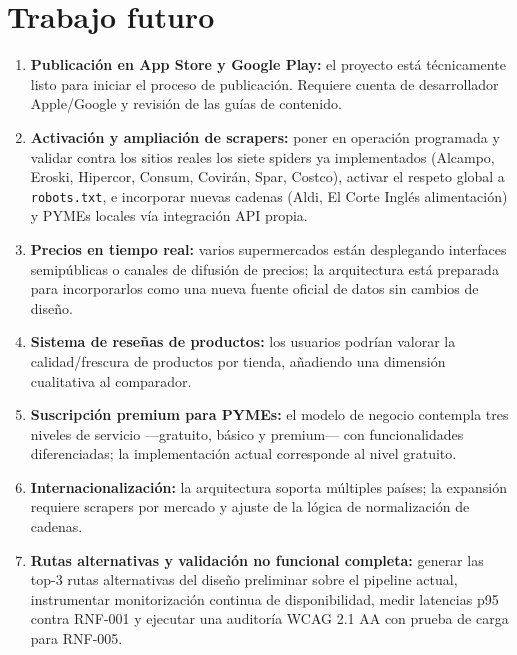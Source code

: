 \section{Trabajo futuro}\label{sec:trabajofuturo}

\begin{enumerate}
  \item \textbf{Publicaci\'on en App Store y Google Play:} el proyecto est\'a t\'ecnicamente listo
    para iniciar el proceso de publicaci\'on. Requiere cuenta de desarrollador Apple/Google y
    revisi\'on de las gu\'ias de contenido.

  \item \textbf{Activaci\'on y ampliaci\'on de scrapers:} poner en operaci\'on programada y
    validar contra los sitios reales los siete spiders ya implementados (Alcampo, Eroski,
    Hipercor, Consum, Covir\'an, Spar, Costco), activar el respeto global a \texttt{robots.txt},
    e incorporar nuevas cadenas (Aldi, El Corte Ingl\'es alimentaci\'on) y PYMEs locales v\'ia
    integraci\'on API propia.

  \item \textbf{Precios en tiempo real:} varios supermercados est\'an desplegando interfaces
    semip\'ublicas o canales de difusi\'on de precios; la arquitectura est\'a preparada para
    incorporarlos como una nueva fuente oficial de datos sin cambios de dise\~no.

  \item \textbf{Sistema de rese\~nas de productos:} los usuarios podr\'ian valorar la
    calidad/frescura de productos por tienda, a\~nadiendo una dimensi\'on cualitativa al
    comparador.

  \item \textbf{Suscripci\'on premium para PYMEs:} el modelo de negocio contempla tres niveles
    de servicio ---gratuito, b\'asico y premium--- con funcionalidades diferenciadas; la
    implementaci\'on actual corresponde al nivel gratuito.

  \item \textbf{Internacionalizaci\'on:} la arquitectura soporta m\'ultiples pa\'ises; la
    expansi\'on requiere scrapers por mercado y ajuste de la l\'ogica de normalizaci\'on de
    cadenas.

  \item \textbf{Rutas alternativas y validaci\'on no funcional completa:} generar las top-3
    rutas alternativas del dise\~no preliminar sobre el pipeline actual, instrumentar
    monitorizaci\'on continua de disponibilidad, medir latencias p95 contra RNF-001 y ejecutar
    una auditor\'ia WCAG 2.1 AA \cite{wcag21} con prueba de carga para RNF-005.
\end{enumerate}

